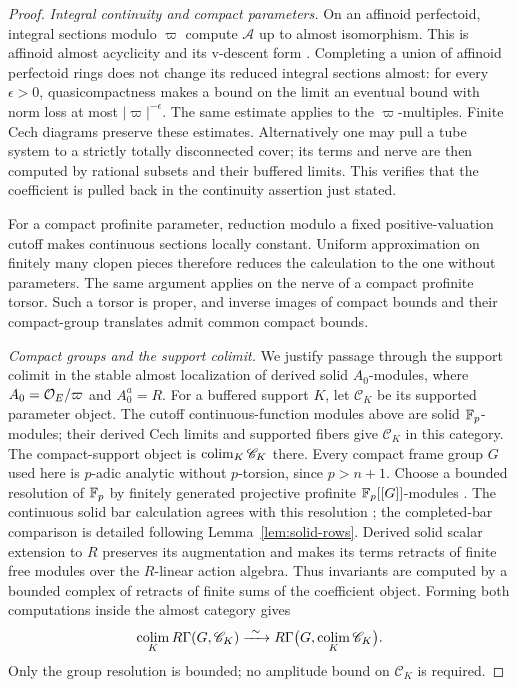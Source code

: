 \begin{proof}
\emph{Integral continuity and compact parameters.}
On an affinoid perfectoid, integral sections modulo $\varpi$ compute
$\mathscr A$ up to almost isomorphism.  This is affinoid almost
acyclicity and its v-descent form
\cite[Proposition~8.8]{ScholzeDiamonds}.  Completing a union of
affinoid perfectoid rings does not change its reduced integral
sections almost: for every $\epsilon>0$, quasicompactness makes a
bound on the limit an eventual bound with norm loss at most
$|\varpi|^{-\epsilon}$.  The same estimate applies to the
$\varpi$-multiples.  Finite Cech diagrams preserve these estimates.
Alternatively one may pull a tube system to a strictly totally
disconnected cover; its terms and nerve are then computed by
rational subsets and their buffered limits.  This verifies that the
coefficient is pulled back in the continuity assertion just stated.

For a compact profinite parameter, reduction modulo a fixed
positive-valuation cutoff makes continuous sections locally
constant.  Uniform approximation on finitely many clopen pieces
therefore reduces the calculation to the one without parameters.
The same argument applies on the nerve of a compact profinite
torsor.  Such a torsor is proper, and inverse images of compact
bounds and their compact-group translates admit common compact
bounds.

\emph{Compact groups and the support colimit.}
We justify passage through the support colimit in the stable almost
localization of derived solid $A_0$-modules, where
$A_0=\mathcal O_E/\varpi$ and $A_0^a=R$.  For a buffered support $K$, let
$\mathscr C_K$ be its supported parameter object.  The cutoff
continuous-function modules above are solid $\mathbb F_p$-modules; their derived
Cech limits and supported fibers give $\mathscr C_K$ in this category.
The compact-support object is $\operatorname*{colim}_K\mathscr C_K$ there.
Every compact frame group $G$ used here is $p$-adic analytic without
$p$-torsion, since $p>n+1$.  Choose a bounded resolution of $\mathbb F_p$ by
finitely generated projective profinite $\mathbb F_p[[G]]$-modules
\cite[Proposition~3.3]{ArdakovWadsley}.  The continuous solid bar
calculation agrees with this resolution
\cite[Theorems~3.2 and~3.14(i), Proposition~3.21]{Tang}; the completed-bar
comparison is detailed following Lemma~\ref{lem:solid-rows}.
Derived solid scalar extension to $R$ preserves its augmentation and
makes its terms retracts of finite free modules over the $R$-linear
action algebra.  Thus invariants are computed by a bounded complex
of retracts of finite sums of the coefficient object.  Forming both
computations inside the almost category gives
\[
 \operatorname*{colim}_KR\Gamma(G,\mathscr C_K)
   \xrightarrow{\ \sim\ }
 R\Gamma\bigl(G,\operatorname*{colim}_K\mathscr C_K\bigr).
\]
Only the group resolution is bounded; no amplitude bound on
$\mathscr C_K$ is required.


\end{proof}
